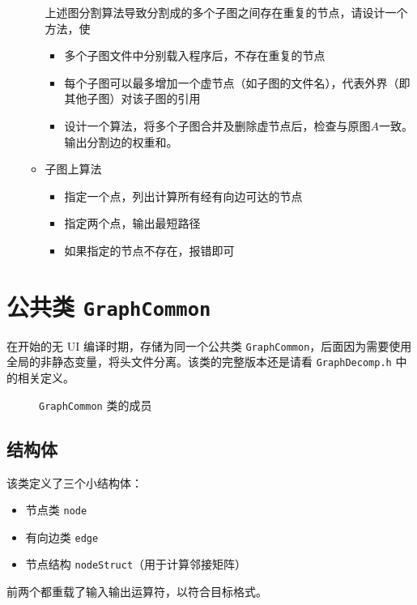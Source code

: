 \documentclass[a4paper,12pt]{article}
\begin{document}
\begin{CJK}{UTF8}{song}
\begin{enumerate}
\begin{itemize}
        上述图分割算法导致分割成的多个子图之间存在重复的节点，请设计一个方法，使
        \begin{itemize}
            \item 多个子图文件中分别载入程序后，不存在重复的节点
            \item 每个子图可以最多增加一个虚节点（如子图的文件名），代表外界（即其他子图）对该子图的引用
            \item 设计一个算法，将多个子图合并及删除虚节点后，检查与原图$A$一致。输出分割边的权重和。
        \end{itemize}
        \item 子图上算法
        \begin{itemize}
            \item 指定一个点，列出计算所有经有向边可达的节点
            \item 指定两个点，输出最短路径
            \item 如果指定的节点不存在，报错即可
        \end{itemize}
    \end{itemize}
\end{enumerate}


\section{公共类 \texttt{GraphCommon}}

在开始的无 UI 编译时期，存储为同一个公共类 \texttt{GraphCommon}，后面因为需要使用全局的非静态变量，将头文件分离。该类的完整版本还是请看 \texttt{GraphDecomp.h} 中的相关定义。

\begin{figure}[H]
    \centering
    
    \caption{\texttt{GraphCommon} 类的成员}
\end{figure}


\subsection{结构体}

该类定义了三个小结构体：
\begin{itemize}
    \item 节点类 \texttt{node}
    \item 有向边类 \texttt{edge}
    \item 节点结构 \texttt{nodeStruct}（用于计算邻接矩阵）
\end{itemize}

前两个都重载了输入输出运算符，以符合目标格式。


\end{CJK}
\end{document}
